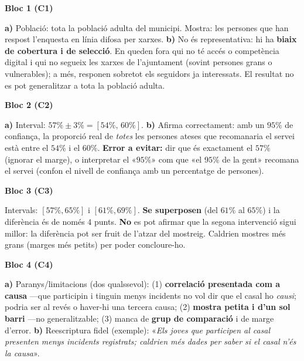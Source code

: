 \newpage
\begin{solucions}

\noindent\textbf{Bloc 1 (C1)}
\begin{sollist}
  \item \textbf{a)} Població: tota la població adulta del municipi. Mostra: les persones que
        han respost l'enquesta en línia difosa per xarxes.
        \textbf{b)} No és representativa: hi ha \textbf{biaix de cobertura i de selecció}.
        En queden fora qui no té accés o competència digital i qui no segueix les xarxes de
        l'ajuntament (sovint persones grans o vulnerables); a més, responen sobretot els
        seguidors ja interessats. El resultat no es pot generalitzar a tota la població
        adulta.
\end{sollist}

\noindent\textbf{Bloc 2 (C2)}
\begin{sollist}\setcounter{enumi}{1}
  \item \textbf{a)} Interval: $57\%\pm 3\%=[54\%,\,60\%]$.
        \textbf{b)} Afirma correctament: amb un $95\%$ de confiança, la proporció real de
        \emph{totes} les persones ateses que recomanaria el servei està entre el $54\%$ i el
        $60\%$. \textbf{Error a evitar:} dir que és exactament el $57\%$ (ignorar el marge),
        o interpretar el «$95\%$» com que «el $95\%$ de la gent» recomana el servei (confon
        el nivell de confiança amb un percentatge de persones).
\end{sollist}

\noindent\textbf{Bloc 3 (C3)}
\begin{sollist}\setcounter{enumi}{2}
  \item Intervals: $[57\%,65\%]$ i $[61\%,69\%]$. \textbf{Se superposen} (del $61\%$ al
        $65\%$) i la diferència és de només $4$ punts. \textbf{No} es pot afirmar que la
        segona intervenció sigui millor: la diferència pot ser fruit de l'atzar del
        mostreig. Caldrien mostres més grans (marges més petits) per poder concloure-ho.
\end{sollist}

\noindent\textbf{Bloc 4 (C4)}
\begin{sollist}\setcounter{enumi}{3}
  \item \textbf{a)} Paranys/limitacions (dos qualssevol): (1) \textbf{correlació presentada
        com a causa} —que participin i tinguin menys incidents no vol dir que el casal ho
        \emph{causi}; podria ser al revés o haver-hi una tercera causa; (2) \textbf{mostra
        petita i d'un sol barri} —no generalitzable; (3) manca de \textbf{grup de
        comparació} i de marge d'error.
        \textbf{b)} Reescriptura fidel (exemple): «\emph{Els joves que participen al casal
        presenten menys incidents registrats; caldrien més dades per saber si el casal
        n'és la causa}».
\end{sollist}

\end{solucions}

